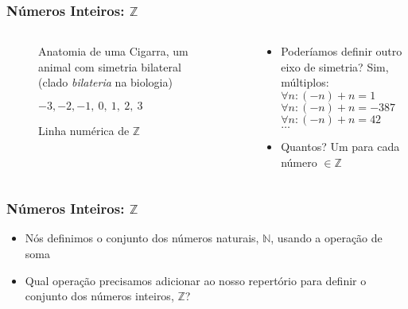 \documentclass[usenames,dvipsnames,svgnames]{beamer}
\begin{document}
\begin{frame}
	
	\frametitle{Números Inteiros: $\mathbb{Z}$}

	\begin{columns}[t]
	\begin{column}{.3\textwidth}
		\begin{figure}
			\caption{\small Anatomia de uma Cigarra, um animal com simetria bilateral (clado \emph{bilateria} na biologia)}
		\end{figure}
		\begin{figure}
			\small $-3, -2, -1, ~0, ~1, ~2, ~3$
			\caption{\small Linha numérica de $\mathbb{Z}$}
		\end{figure}
	\end{column}
	\begin{column}{.7\textwidth}
		\begin{itemize}
		\item Poderíamos definir outro eixo de simetria? Sim, múltiplos: \\ $\forall n: (-n) + n = 1$ \\ $\forall n: (-n) + n = -387$ \\ $\forall n: (-n) + n = 42$ \\ $\dots$
		\item Quantos? Um para cada número $\in \mathbb{Z}$
		\end{itemize}
	\end{column}
	\end{columns}

\end{frame}

\begin{frame}
	
	\frametitle{Números Inteiros: $\mathbb{Z}$}

	\begin{itemize}
		\item Nós definimos o conjunto dos números naturais, $\mathbb{N}$, usando a operação de soma
		\item Qual operação precisamos adicionar ao nosso repertório para definir o conjunto dos números inteiros, $\mathbb{Z}$?
 	\end{itemize}

\end{frame}
\end{document}
